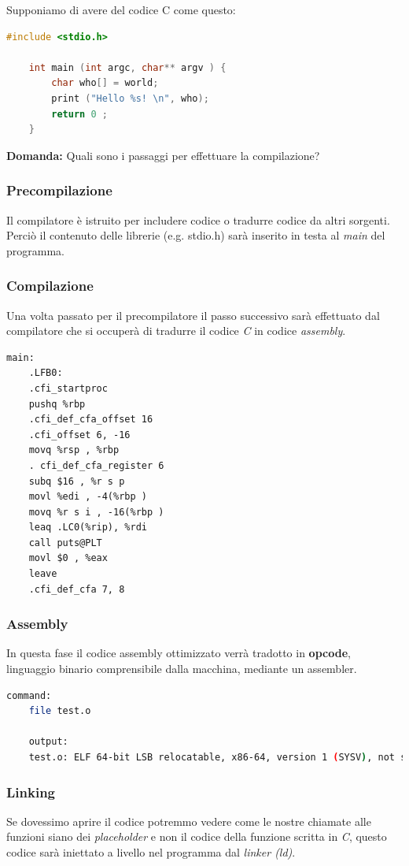 Supponiamo di avere del codice C come questo:
\begin{lstlisting}[language=C]
    #include <stdio.h>
    
    int main (int argc, char** argv ) { 
        char who[] = world;
        print ("Hello %s! \n", who);
        return 0 ;
    }
\end{lstlisting}
\textbf{Domanda:} Quali sono i passaggi per effettuare la compilazione?

\subsubsection{Precompilazione}
Il compilatore è istruito per includere codice o tradurre codice da altri sorgenti. Perciò il contenuto delle librerie (e.g. stdio.h) sarà inserito in testa al \textit{main} del programma.

\subsubsection{Compilazione}
Una volta passato per il precompilatore il passo successivo sarà effettuato dal compilatore che si occuperà di tradurre il codice \textit{C} in codice \textit{assembly}.

\begin{lstlisting}[language={[x86masm]Assembler}]
main:
    .LFB0:
    .cfi_startproc
    pushq %rbp
    .cfi_def_cfa_offset 16
    .cfi_offset 6, -16
    movq %rsp , %rbp
    . cfi_def_cfa_register 6
    subq $16 , %r s p
    movl %edi , -4(%rbp )
    movq %r s i , -16(%rbp )
    leaq .LC0(%rip), %rdi
    call puts@PLT
    movl $0 , %eax
    leave
    .cfi_def_cfa 7, 8
\end{lstlisting}

\subsubsection{Assembly}
In questa fase il codice assembly ottimizzato verrà tradotto in \textbf{opcode}, linguaggio binario comprensibile dalla macchina, mediante un assembler.
\begin{lstlisting}[language=bash]
    command:
    file test.o

    output:
    test.o: ELF 64-bit LSB relocatable, x86-64, version 1 (SYSV), not stripped 
\end{lstlisting}

\subsubsection{Linking}
Se dovessimo aprire il codice potremmo vedere come le nostre chiamate alle funzioni siano dei \textit{placeholder} e non il codice della funzione scritta in \textit{C}, questo codice sarà iniettato a livello nel programma dal \textit{linker (ld)}.

